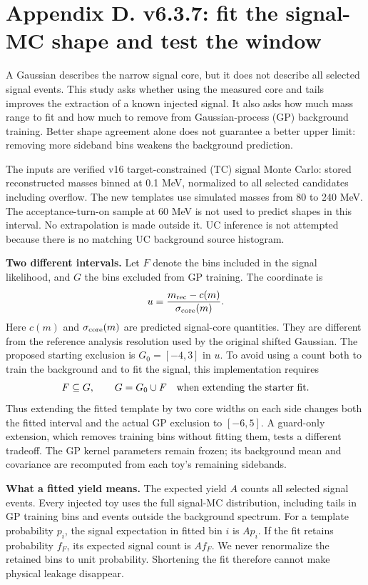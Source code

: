 \documentclass[11pt]{article}
\begin{document}
\section*{Appendix D. v6.3.7: fit the signal-MC shape and test the window}

A Gaussian describes the narrow signal core, but it does not describe all selected signal events. This study asks whether using the measured core and tails improves the extraction of a known injected signal. It also asks how much mass range to fit and how much to remove from Gaussian-process (GP) background training. Better shape agreement alone does not guarantee a better upper limit: removing more sideband bins weakens the background prediction.

The inputs are verified v16 target-constrained (TC) signal Monte Carlo: stored reconstructed masses binned at 0.1 MeV, normalized to all selected candidates including overflow. The new templates use simulated masses from 80 to 240 MeV. The acceptance-turn-on sample at 60 MeV is not used to predict shapes in this interval. No extrapolation is made outside it. UC inference is not attempted because there is no matching UC background source histogram.

\textbf{Two different intervals.} Let $F$ denote the bins included in the signal likelihood, and $G$ the bins excluded from GP training. The coordinate is
\[
 u=\frac{m_{\rm rec}-c(m)}{\sigma_{\rm core}(m)}.
\]
Here $c(m)$ and $\sigma_{\rm core}(m)$ are predicted signal-core quantities. They are different from the reference analysis resolution used by the original shifted Gaussian. The proposed starting exclusion is $G_0=[-4,3]$ in $u$. To avoid using a count both to train the background and to fit the signal, this implementation requires
\[
 F\subseteq G,\qquad G=G_0\cup F\quad\hbox{when extending the starter fit.}
\]
Thus extending the fitted template by two core widths on each side changes both the fitted interval and the actual GP exclusion to $[-6,5]$. A guard-only extension, which removes training bins without fitting them, tests a different tradeoff. The GP kernel parameters remain frozen; its background mean and covariance are recomputed from each toy's remaining sidebands.

\textbf{What a fitted yield means.} The expected yield $A$ counts all selected signal events. Every injected toy uses the full signal-MC distribution, including tails in GP training bins and events outside the background spectrum. For a template probability $p_i$, the signal expectation in fitted bin $i$ is $A p_i$. If the fit retains probability $f_F$, its expected signal count is $A f_F$. We never renormalize the retained bins to unit probability. Shortening the fit therefore cannot make physical leakage disappear.
\end{document}
